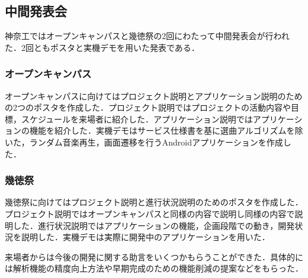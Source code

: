 \subsection{中間発表会}
\par 神奈工ではオープンキャンパスと幾徳祭の2回にわたって中間発表会が行われた．2回ともポスタと実機デモを用いた発表である．

\subsubsection{オープンキャンパス}
\par オープンキャンパスに向けてはプロジェクト説明とアプリケーション説明のための2つのポスタを作成した．プロジェクト説明ではプロジェクトの活動内容や目標，スケジュールを来場者に紹介した．アプリケーション説明ではアプリケーションの機能を紹介した．実機デモはサービス仕様書を基に選曲アルゴリズムを除いた，ランダム音楽再生，画面遷移を行うAndroidアプリケーションを作成した．

\subsubsection{幾徳祭}
\par 幾徳祭に向けてはプロジェクト説明と進行状況説明のためのポスタを作成した．プロジェクト説明ではオープンキャンパスと同様の内容で説明し同様の内容で説明した．進行状況説明ではアプリケーションの機能，企画段階での動き，開発状況を説明した．実機デモは実際に開発中のアプリケーションを用いた．

\par 来場者からは今後の開発に関する助言をいくつかもらうことができた．具体的には解析機能の精度向上方法や早期完成のための機能削減の提案などをもらった．
